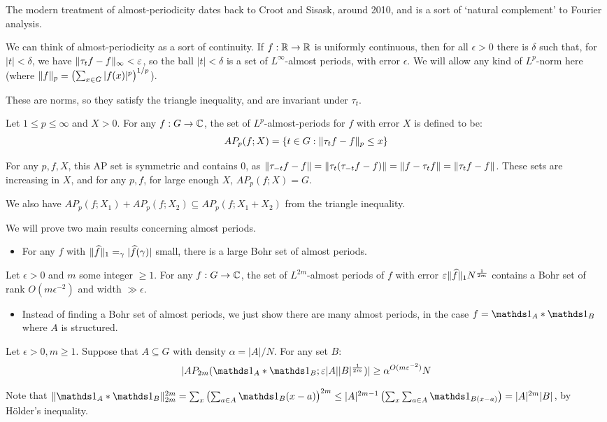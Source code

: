 \documentclass[10pt,a4paper]{article}
\let\E\relax
\DeclareMathOperator*{\E}{\raisebox{-0.45em}{\text{\huge $\mathds{E}$}}}
\begin{document}
The modern treatment of almost-periodicity dates back to Croot and Sisask, around 2010, and is a sort of `natural complement' to Fourier analysis.

We can think of almost-periodicity as a sort of continuity. If $f: \mathbb{R} \to \mathbb{R}$ is uniformly continuous, then for all $\epsilon > 0$ there is $\delta$ such that, for $|t| < \delta$, we have $\lVert\tau_t f - f\rVert_{\infty}<\varepsilon$, so the ball $|t|<\delta$ is a set of $L^\infty$-almost periods, with error $\epsilon$. We will allow any kind of $L^p$-norm here (where $\lVert f\rVert_p = \left(\sum_{x \in G} |f(x)|^p\right)^{1/p}$).

These are norms, so they satisfy the triangle inequality, and are invariant under $\tau_t$.

\begin{definition}
  Let $1 \leq p \leq \infty$ and $X>0$. For any $f: G \to \mathbb{C}$, the set of $L^p$-almost-periods for $f$ with error $X$ is defined to be:
  \[AP_p(f;X) = \{t \in G: \lVert\tau_t f - f\rVert_p \leq x\}\]
\end{definition}
For any $p,f,X$, this AP set is symmetric and contains 0, as $\lVert\tau_{-t}f - f\rVert = \lVert\tau_t ( \tau_{-t}f -f)\rVert = \lVert f-\tau_t f\rVert = \lVert\tau_t f-f\rVert$. These sets are increasing in $X$, and for any $p, f$, for large enough $X$, $AP_p(f;X) = G$.

We also have $AP_p(f;X_1) + AP_p(f; X_2) \subseteq AP_p(f; X_1+X_2)$ from the triangle inequality.

We will prove two main results concerning almost periods.
\begin{itemize}
  \item For any $f$ with $\norm{\hat{f}}_1 = \E_\gamma |\hat{f}(\gamma)|$ small, there is a large Bohr set of almost periods.
\end{itemize}
\begin{theorem}
  Let $\epsilon > 0$ and $m$ some integer $\geq 1$. For any $f: G \to \mathbb{C}$, the set of $L^{2m}$-almost periods of $f$ with error $\varepsilon\lVert\widehat{f}\rVert_1 N^{\frac{1}{2m}}$ contains a Bohr set of rank $O(m\epsilon^{-2})$ and width $\gg \epsilon$.
\end{theorem}
\begin{itemize}
  \item Instead of finding a Bohr set of almost periods, we just show there are many almost periods, in the case $f=\one_A \ast \one_B$ where $A$ is structured.
\end{itemize}
\begin{theorem}
  Let $\epsilon >0, m \geq 1$. Suppose that $A \subseteq G$ with density $\alpha = |A|/N$. For any set $B$:
  \[|AP_{2m}(\one_A \ast \one_B; \epsilon |A||B|^{\frac{1}{2m}})| \geq \alpha^{O(m\epsilon^{-2})}N\]
\end{theorem}
Note that $\norm{\one_A \ast \one_B}_{2m}^{2m} = \sum_x \left(\sum_{a \in A}\one_B(x-a)\right)^{2m} \leq |A|^{2m-1}\left(\sum_x \sum_{a \in A}\one_{B(x-a)}\right) = |A|^{2m}|B|$, by H\"older's inequality.
\end{document}
